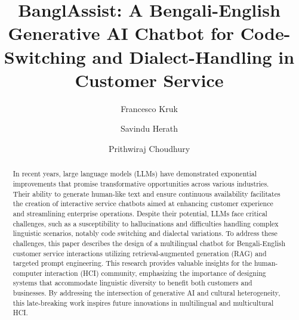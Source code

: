 \documentclass[sigconf]{acmart}
\begin{document}

\title[BanglAssist: A Generative AI Customer Service Chatbot for Code-Switching and Dialect-Handling]{BanglAssist: A Bengali-English Generative AI Chatbot for Code-Switching and Dialect-Handling in Customer Service}

\author{Francesco Kruk}
\author{Savindu Herath}
\author{Prithwiraj Choudhury}


\begin{abstract}
  In recent years, large language models (LLMs) have demonstrated exponential improvements that promise transformative opportunities across various industries. Their ability to generate human-like text and ensure continuous availability facilitates the creation of interactive service chatbots aimed at enhancing customer experience and streamlining enterprise operations. Despite their potential, LLMs face critical challenges, such as a susceptibility to hallucinations and difficulties handling complex linguistic scenarios, notably code switching and dialectal variations. To address these challenges, this paper describes the design of a multilingual chatbot for Bengali-English customer service interactions utilizing retrieval-augmented generation (RAG) and targeted prompt engineering. This research provides valuable insights for the human-computer interaction (HCI) community, emphasizing the importance of designing systems that accommodate linguistic diversity to benefit both customers and businesses. By addressing the intersection of generative AI and cultural heterogeneity, this late-breaking work inspires future innovations in multilingual and multicultural HCI.
\end{abstract}
\end{document}

